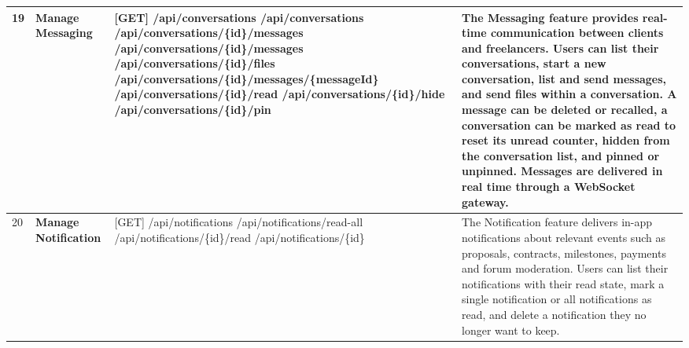 \begin{longtable}{|C{0.7cm}|L{2.6cm}|S{6.6cm}|L{5.2cm}|}
19
&
\textbf{Manage Messaging}
&
[GET] /\allowbreak{}api/\allowbreak{}conversations \newline
[POST] /\allowbreak{}api/\allowbreak{}conversations \newline
[GET] /\allowbreak{}api/\allowbreak{}conversations/\allowbreak{}\{id\}/\allowbreak{}messages \newline
[POST] /\allowbreak{}api/\allowbreak{}conversations/\allowbreak{}\{id\}/\allowbreak{}messages \newline
[POST] /\allowbreak{}api/\allowbreak{}conversations/\allowbreak{}\{id\}/\allowbreak{}files \newline
[DELETE] /\allowbreak{}api/\allowbreak{}conversations/\allowbreak{}\{id\}/\allowbreak{}messages/\allowbreak{}\{messageId\} \newline
[PATCH] /\allowbreak{}api/\allowbreak{}conversations/\allowbreak{}\{id\}/\allowbreak{}read \newline
[PATCH] /\allowbreak{}api/\allowbreak{}conversations/\allowbreak{}\{id\}/\allowbreak{}hide \newline
[PATCH] /\allowbreak{}api/\allowbreak{}conversations/\allowbreak{}\{id\}/\allowbreak{}pin
&
The Messaging feature provides real-time communication between clients and freelancers. Users can list their conversations, start a new conversation, list and send messages, and send files within a conversation. A message can be deleted or recalled, a conversation can be marked as read to reset its unread counter, hidden from the conversation list, and pinned or unpinned. Messages are delivered in real time through a WebSocket gateway.
\\ \hline

20
&
\textbf{Manage Notification}
&
[GET] /\allowbreak{}api/\allowbreak{}notifications \newline
[PATCH] /\allowbreak{}api/\allowbreak{}notifications/\allowbreak{}read-all \newline
[PATCH] /\allowbreak{}api/\allowbreak{}notifications/\allowbreak{}\{id\}/\allowbreak{}read \newline
[DELETE] /\allowbreak{}api/\allowbreak{}notifications/\allowbreak{}\{id\}
&
The Notification feature delivers in-app notifications about relevant events such as proposals, contracts, milestones, payments and forum moderation. Users can list their notifications with their read state, mark a single notification or all notifications as read, and delete a notification they no longer want to keep.
\\ \hline


\end{longtable}
